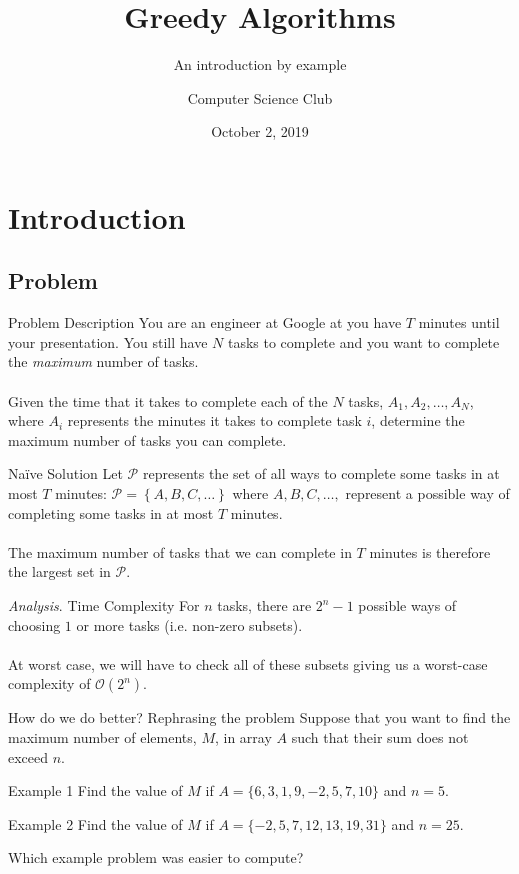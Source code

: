 \documentclass{beamer}
\title{Greedy Algorithms}
\subtitle{An introduction by example}
\institute{Stephen Lewis Secondary School}
\author{Computer Science Club}
\date{October 2, 2019}
\begin{document}
\begin{frame} 
\titlepage 
\end{frame}

\section{Introduction}
\subsection{Problem}
\begin{frame}{Problem Description}
    You are an engineer at Google at you have $T$ minutes until your presentation. You still have $N$ tasks to complete and you want to complete the \textit{maximum} number of tasks.\\~\\
    
    Given the time that it takes to complete each of the $N$ tasks, $A_1, A_2, \ldots, A_N$, where $A_i$ represents the minutes it takes to complete task $i$, determine the maximum number of tasks you can complete.
\end{frame}

\begin{frame}{Na\"{i}ve Solution}
Let $\mathcal{P}$ represents the set of all ways to complete some tasks in at most $T$ minutes: $\mathcal{P}=\left\{A, B, C, \ldots\right\}$ where $A, B, C, \ldots, $ represent a possible way of completing some tasks in at most $T$ minutes.\\~\\

The maximum number of tasks that we can complete in $T$ minutes is therefore the largest set in $\mathcal{P}$.
\begin{block}{\textit{Analysis}. Time Complexity}
For $n$ tasks, there are $2^n-1$ possible ways of choosing $1$ or more tasks (i.e. non-zero subsets).\\~\\At worst case, we will have to check all of these subsets giving us a worst-case complexity of $\mathcal{O}\left(2^n\right).$
\end{block}
\end{frame}

\begin{frame}{How do we do better? Rephrasing the problem}
    Suppose that you want to find the maximum number of elements, $M$, in array $A$ such that their sum does not exceed $n$.
    \begin{block}{Example 1}
        Find the value of $M$ if $A=\{6,3,1,9,-2,5,7,10\}$ and $n=5$.
    \end{block}
    \begin{block}{Example 2}
        Find the value of $M$ if $A=\{-2,5,7,12,13,19,31\}$ and $n=25$.
    \end{block}
    Which example problem was easier to compute?
\end{frame}
\end{document}

